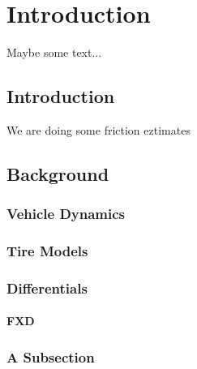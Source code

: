 \chapter{Introduction}

Maybe some text...

\section{Introduction}

We are doing some friction eztimates


\section{Background}


\subsection{Vehicle Dynamics}

\subsection{Tire Models}

\subsection{Differentials}

\subsubsection{FXD}

\subsection{A Subsection}